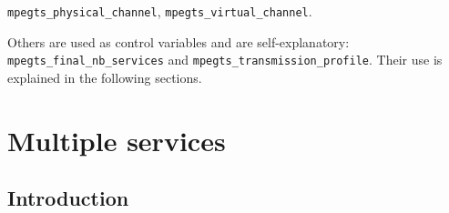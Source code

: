 \documentclass[
	12pt,				%
	openright,			%
	twoside,			%
	a4paper,			%
	brazil,
	french,				%
	english
	]{abntex2}
\begin{document}
\texttt{mpegts\hspace{0.1mm}\hspace{0.1mm}\_\hspace{0.1mm}\hspace{0.1mm}physical\hspace{0.1mm}\hspace{0.1mm}\_\hspace{0.1mm}\hspace{0.1mm}channel}, \texttt{mpegts\hspace{0.1mm}\hspace{0.1mm}\_\hspace{0.1mm}\hspace{0.1mm}virtual\hspace{0.1mm}\hspace{0.1mm}\_\hspace{0.1mm}\hspace{0.1mm}channel}.

Others are used as control variables and are self-explanatory: \texttt{mpegts\hspace{0.1mm}\hspace{0.1mm}\_\hspace{0.1mm}\hspace{0.1mm}final\hspace{0.1mm}\hspace{0.1mm}\_\hspace{0.1mm}\hspace{0.1mm}nb\hspace{0.1mm}\hspace{0.1mm}\_\hspace{0.1mm}\hspace{0.1mm}services} and \texttt{mpegts\hspace{0.1mm}\hspace{0.1mm}\_\hspace{0.1mm}\hspace{0.1mm}transmission\hspace{0.1mm}\hspace{0.1mm}\_\hspace{0.1mm}\hspace{0.1mm}profile}. Their use is explained in the following sections.

\section{Multiple services}

\subsection{Introduction}
\end{document}
